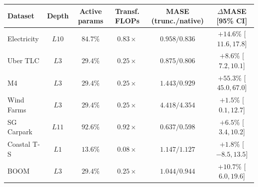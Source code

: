 \begin{tabular}{lccccc}
    \toprule
    Dataset & Depth & Active params & Transf. FLOPs & MASE (trunc./native) & $\Delta$MASE [95\% CI] \\
    \midrule
    Electricity & \(L10\) & \(84.7\%\) & \(0.83\times\) & \(0.958 / 0.836\) & \(+14.6\%\) [\(11.6,17.8\)] \\
    Uber TLC & \(L3\) & \(29.4\%\) & \(0.25\times\) & \(0.875 / 0.806\) & \(+8.6\%\) [\(7.2,10.1\)] \\
    M4 & \(L3\) & \(29.4\%\) & \(0.25\times\) & \(1.443 / 0.929\) & \(+55.3\%\) [\(45.0,67.0\)] \\
    Wind Farms & \(L3\) & \(29.4\%\) & \(0.25\times\) & \(4.418 / 4.354\) & \(+1.5\%\) [\(0.1,12.7\)] \\
    \midrule
    SG Carpark & \(L11\) & \(92.6\%\) & \(0.92\times\) & \(0.637 / 0.598\) & \(+6.5\%\) [\(3.4,10.2\)] \\
    Coastal T-S & \(L1\) & \(13.6\%\) & \(0.08\times\) & \(1.147 / 1.127\) & \(+1.8\%\) [\(-8.5,13.5\)] \\
    BOOM & \(L3\) & \(29.4\%\) & \(0.25\times\) & \(1.044 / 0.944\) & \(+10.7\%\) [\(6.0,19.6\)] \\
    \bottomrule
\end{tabular}
